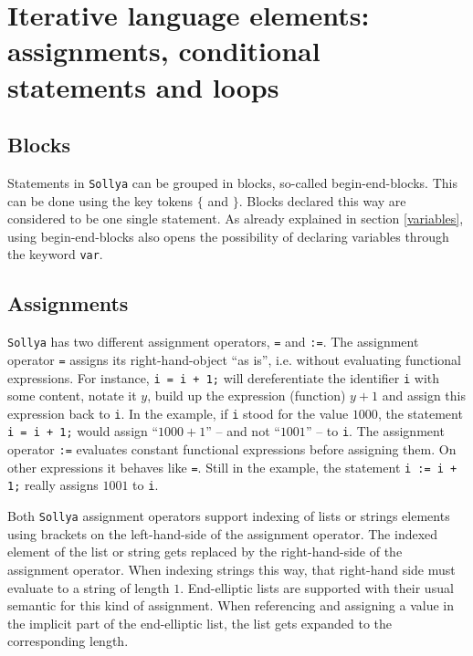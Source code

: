 \documentclass[a4paper]{article}
\newcommand{\key}[1]{\texttt{#1}}
\newcommand{\sollya}{\texttt{Sollya}\xspace}
\begin{document}
\section{Iterative language elements: assignments, conditional statements and loops}

\subsection{Blocks}

Statements in \sollya can be grouped in blocks, so-called
begin-end-blocks.  This can be done using the key tokens \key{$\lbrace$} and
\key{$\rbrace$}. Blocks declared this way are considered to be one single
statement. As already explained in section \ref{variables}, using
begin-end-blocks also opens the possibility of declaring variables
through the keyword \key{var}. 

\subsection{Assignments}

\sollya has two different assignment operators, \texttt{=} and
\texttt{:=}. The assignment operator \texttt{=} assigns its
right-hand-object ``as is'', i.e. without evaluating functional
expressions. For instance, \texttt{i = i + 1;} will dereferentiate the
identifier \texttt{i} with some content, notate it $y$, build up the
expression (function) $y + 1$ and assign this expression back to
\texttt{i}. In the example, if \texttt{i} stood for the value $1000$,
the statement \texttt{i = i + 1;} would assign ``$1000 + 1$'' -- and not
``$1001$'' -- to \texttt{i}. The assignment operator \texttt{:=} evaluates
constant functional expressions before assigning them. On other
expressions it behaves like \texttt{=}. Still in the example, the
statement \texttt{i := i + 1;} really assigns $1001$ to \texttt{i}.

Both \sollya assignment operators support indexing of lists or strings
elements using brackets on the left-hand-side of the assignment
operator. The indexed element of the list or string gets replaced by
the right-hand-side of the assignment operator.  When indexing strings
this way, that right-hand side must evaluate to a string of length
$1$. End-elliptic lists are supported with their usual semantic for
this kind of assignment.  When referencing and assigning a value in
the implicit part of the end-elliptic list, the list gets expanded to
the corresponding length.
\end{document}
